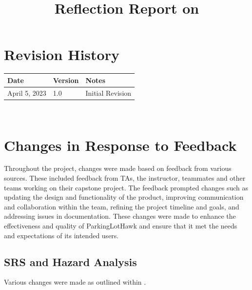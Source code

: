 \documentclass{article}
\title{Reflection Report on \progname}
\author{\authname}
\date{}
\begin{document}
\maketitle

\newpage

\section{Revision History}

\begin{tabularx}{\textwidth}{p{3cm}p{2cm}X}
\toprule {\bf Date} & {\bf Version} & {\bf Notes}\\
\midrule
April 5, 2023 & 1.0 & Initial Revision \\
\bottomrule
\end{tabularx}

~\newpage

\tableofcontents

\listoftables %

\listoffigures %

\newpage


\section{Changes in Response to Feedback}

Throughout the project, changes were made based on feedback from various sources. These included feedback from TAs, the instructor, teammates and other teams working on their capstone project. The feedback prompted changes such as updating the design and functionality of the product, improving communication and collaboration within the team, refining the project timeline and goals, and addressing issues in documentation. These changes were made to enhance the effectiveness and quality of ParkingLotHawk and ensure that it met the needs and expectations of its intended users.

\subsection{SRS and Hazard Analysis}

Various changes were made as outlined within .
\end{document}
